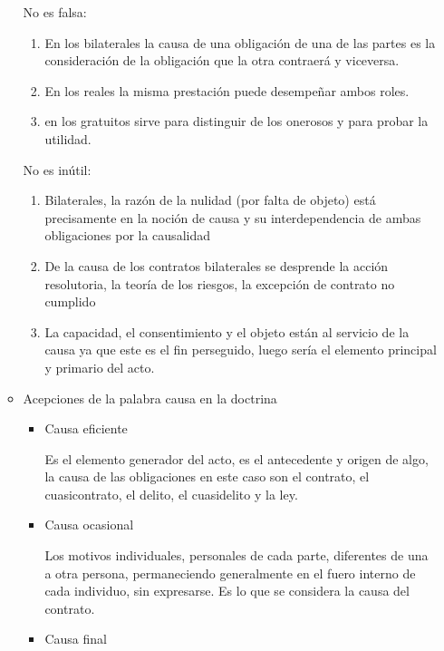 \documentclass[]{article}
\providecommand{\tightlist}{%
  \setlength{\itemsep}{0pt}\setlength{\parskip}{0pt}}
\begin{document}
\begin{itemize}
\begin{itemize}
    No es falsa:

    \begin{enumerate}
    \def\labelenumi{\arabic{enumi}.}
    \tightlist
    \item
      En los bilaterales la causa de una obligación de una de las partes
      es la consideración de la obligación que la otra contraerá y
      viceversa.
    \item
      En los reales la misma prestación puede desempeñar ambos roles.
    \item
      en los gratuitos sirve para distinguir de los onerosos y para
      probar la utilidad.
    \end{enumerate}

    No es inútil:

    \begin{enumerate}
    \def\labelenumi{\arabic{enumi}.}
    \tightlist
    \item
      Bilaterales, la razón de la nulidad (por falta de objeto) está
      precisamente en la noción de causa y su interdependencia de ambas
      obligaciones por la causalidad
    \item
      De la causa de los contratos bilaterales se desprende la acción
      resolutoria, la teoría de los riesgos, la excepción de contrato no
      cumplido
    \item
      La capacidad, el consentimiento y el objeto están al servicio de
      la causa ya que este es el fin perseguido, luego sería el elemento
      principal y primario del acto.
    \end{enumerate}
  \item
    Acepciones de la palabra causa en la doctrina

    \begin{itemize}
    \item
      Causa eficiente

      Es el elemento generador del acto, es el antecedente y origen de
      algo, la causa de las obligaciones en este caso son el contrato,
      el cuasicontrato, el delito, el cuasidelito y la ley.
    \item
      Causa ocasional

      Los motivos individuales, personales de cada parte, diferentes de
      una a otra persona, permaneciendo generalmente en el fuero interno
      de cada individuo, sin expresarse. Es lo que se considera la causa
      del contrato.
    \item
      Causa final


\end{itemize}
\end{itemize}
\end{itemize}
\end{document}
